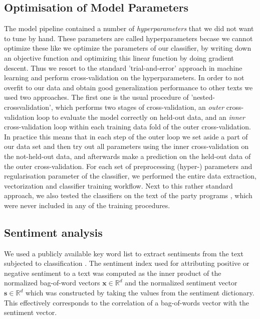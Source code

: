 \documentclass{article} %
\renewcommand{\vec}[1]{\mathbf{#1}}
\newcommand{\R}{\ensuremath{\mathds{R}}}
\begin{document}
\subsection{Optimisation of Model Parameters}\label{sec:crossvalidation}
The model pipeline contained a number of {\em hyperparameters} that we did not want to tune by hand. These parameters are called hyperparameters becase we cannot optimize these like we optimize the parameters of our classifier, by writing down an objective function and optimizing this linear function by doing gradient descent. Thus we resort to the standard 'trial-and-error' approach in machine learning and perform cross-validation on the hyperparameters. In order to not overfit to our data and obtain good generalization performance to other texts we used two approaches. The first one is the usual procedure of 'nested-crossvalidation', which performs two stages of cross-validation, an {\em outer} cross-validation loop to evaluate the model correctly on held-out data, and an {\em inner} cross-validation loop within each training data fold of the outer cross-validation. In practice this means that in each step of the outer loop we set aside a part of our data set and then try out all parameters using the inner cross-validation on the not-held-out data, and afterwards make a prediction on the held-out data of the outer cross-validation. For each set of preprocessing (hyper-) parameters and regularisation parameter of the classifier, we performed the entire data extraction, vectorization and classifier training workflow. Next to this rather standard approach, we also tested the classifiers on the text of the party programs \cite{linke_parteiprogramm, gruene_parteiprogramm,spd_parteiprogramm, cdu_parteiprogramm}, which were never included in any of the training procedures.

\subsection{Sentiment analysis}
We used a publicly available key word list to extract sentiments from the text subjected to classification \cite{remquahey2010}. The sentiment index used for attributing positive or negative sentiment to a text was computed  as the inner product of the normalized bag-of-word vectors $\vec{x}\in\R^d$ and the normalized sentiment vector $\vec{s}\in\R^d$ which was constructed by taking the values from the sentiment dictionary. This effectively corresponds to the correlation of a bag-of-words vector with the sentiment vector.
\end{document}

